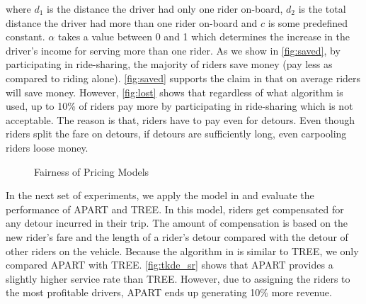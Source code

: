 \noindent where $d_1$ is the distance the driver had only one rider on-board, $d_2$ is the total distance the driver had more than one rider on-board and $c$ is some predefined constant. $\alpha$ takes a value between 0 and 1 which determines the increase in the driver's income for serving more than one rider. As we show in \cref{fig:saved}, by participating in ride-sharing, the majority of riders save money (pay less as compared to riding alone). \cref{fig:saved} supports the claim in \cite{Ma13} that on average riders will save money. However, \cref{fig:lost} shows that regardless of what algorithm is used, up to 10\% of riders pay more by participating in ride-sharing which is not acceptable. The reason is that, riders have to pay even for detours. Even though riders split the fare on detours, if detours are sufficiently long, even carpooling riders loose money.

\begin{figure}[h!]
	\centering
    \vspace{-0.15in}
    \caption{Fairness of Pricing Models}
    \label{fig:fairness}
\end{figure}

\vspace{-3mm}
In the next set of experiments, we apply the model in \cite{Ma15} and evaluate the performance of APART and TREE. In this model, riders get compensated for any detour incurred in their trip. The amount of compensation is based on the new rider's fare and the length of a rider's detour compared with the detour of other riders on the vehicle. Because the algorithm in \cite{Ma15} is similar to TREE, we only compared APART with TREE. \cref{fig:tkde_sr} shows that APART provides a slightly higher service rate than TREE. However, due to assigning the riders to the most profitable drivers, APART ends up generating 10\% more revenue.

